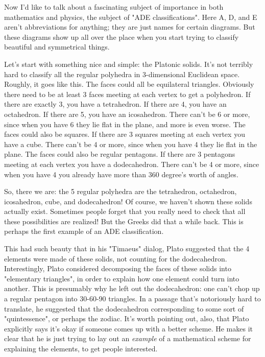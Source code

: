 

Now I'd like to talk about a fascinating subject of importance in both
mathematics and physics, the subject of "ADE
classifications".  Here A, D, and E aren't abbreviations for
anything; they are just names for certain diagrams.  But these
diagrams show up all over the place when you start trying to classify
beautiful and symmetrical things.

Let's start with something nice and simple: the Platonic solids.  
It's not terribly hard to classify all the regular polyhedra in
3-dimensional Euclidean space.  Roughly, it goes like this.  The 
faces could all be equilateral triangles.  Obviously there need to
be at least 3 faces meeting at each vertex to get a polyhedron.
If there are exactly 3, you have a tetrahedron.  If there are 4,
you have an octahedron.  If there are 5, you have an icosahedron.
There can't be 6 or more, since when you have 6 they lie flat in 
the plane, and more is even worse.  The faces could also be squares.
If there are 3 squares meeting at each vertex you have a cube.
There can't be 4 or more, since when you have 4 they lie flat in 
the plane.  The faces could also be regular pentagons.  If there
are 3 pentagons meeting at each vertex you have a dodecahedron.  
There can't be 4 or more, since when you have 4 you already have
more than 360 degree's worth of angles.  

So, there we are: the 5 regular polyhedra are the tetrahedron,
octahedron, icosahedron, cube, and dodecahedron!  Of course, we
haven't shown these solids actually exist.  Sometimes people forget
that you really need to check that all these possibilities are
realized!  But the Greeks did that a while back.  This is perhaps the
first example of an ADE classification.

This had such beauty that in his "Timaeus" dialog, Plato suggested
that the 4 elements were made of these solids, not counting for the
dodecahedron.  Interestingly, Plato considered decomposing the faces
of these solids into "elementary triangles", in order to explain how
one element could turn into another.  This is presumably why he left
out the dodecahedron: one can't chop up a regular pentagon into
30-60-90 triangles.  In a passage that's notoriously hard to
translate, he suggested that the dodecahedron corresponding to some
sort of "quintessence", or perhaps the zodiac.  It's worth pointing
out, also, that Plato explicitly says it's okay if someone comes up
with a better scheme.  He makes it clear that he is just trying to lay
out an \emph{example} of a mathematical scheme for explaining the elements,
to get people interested.

